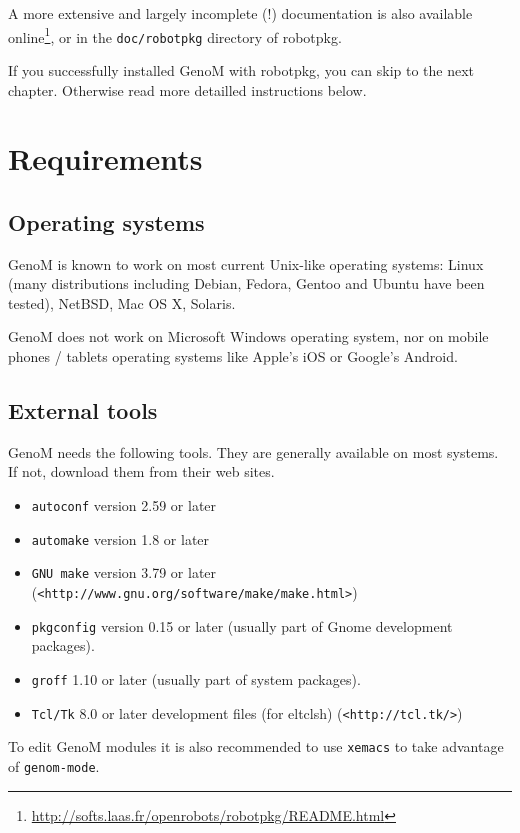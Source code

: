 A more extensive and largely incomplete (!) documentation is also
available
online\footnote{\url{http://softs.laas.fr/openrobots/robotpkg/README.html}},
or in the \texttt{doc/robotpkg} directory of robotpkg. 

If you successfully installed GenoM with robotpkg, you can skip to the
next chapter. Otherwise read more detailled instructions below.

\section{Requirements}
\label{sec|configuration|requirements}

\subsection{Operating systems}

GenoM is known to work on most current Unix-like operating systems:
Linux (many distributions including Debian, Fedora, Gentoo and Ubuntu
have been tested), NetBSD, Mac OS X, Solaris.

GenoM does not work on Microsoft Windows operating system, nor on
mobile phones / tablets operating systems like Apple's iOS or Google's
Android. 

\subsection{External tools}

GenoM needs the following tools.
They are generally available on most systems. If not, download
them from their web sites. 

\begin{itemize}
\item \texttt{autoconf} version 2.59 or later
\item \texttt{automake} version 1.8 or later
\item \texttt{GNU make} version 3.79 or later  (\texttt{<http://www.gnu.org/software/make/make.html>})
\item \texttt{pkgconfig} version 0.15 or later (usually part of Gnome development packages).
\item \texttt{groff} 1.10 or later (usually part of system packages).
\item \texttt{Tcl/Tk} 8.0 or later development files (for eltclsh) (\texttt{<http://tcl.tk/>})
\end{itemize}

To edit GenoM modules it is also recommended to use \texttt{xemacs} to take
advantage of \texttt{genom-mode}.

